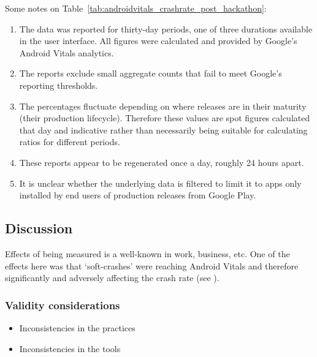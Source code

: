 Some notes on Table~\ref{tab:androidvitals_crashrate_post_hackathon}:
\begin{enumerate}
    \item The data was reported for thirty-day periods, one of three durations available in the user interface. All figures were calculated and provided by Google's Android Vitals analytics.
    \item The reports exclude small aggregate counts that fail to meet Google's reporting thresholds.
    \item The percentages fluctuate depending on where releases are in their maturity (their production lifecycle). Therefore these values are spot figures calculated that day and indicative rather than necessarily being suitable for calculating ratios for different periods. %
    \item These reports appear to be regenerated once a day, roughly 24 hours apart.
    \item It is unclear whether the underlying data is filtered to limit it to apps only installed by end users of production releases from Google Play.
\end{enumerate}




\subsection{Discussion}
Effects of being measured is a well-known in work, business, etc. One of the effects here was that `soft-crashes' were reaching Android Vitals and therefore significantly and adversely affecting the crash rate (see \cite{CATDROID-426-JIRA}).

\subsubsection{Validity considerations}
\begin{itemize}
    \item Inconsistencies in the practices
    \item Inconsistencies in the tools
\end{itemize}

